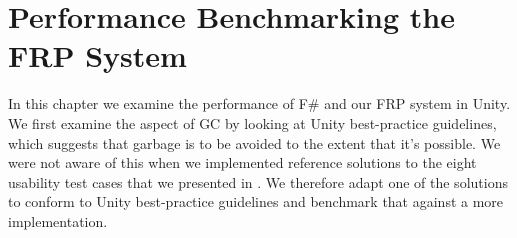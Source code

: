 \section{Performance Benchmarking the FRP System}
In this chapter we examine the performance of F\# and our \gls{FRP} system in Unity. We first examine the aspect of \gls{GC} by looking at Unity best-practice guidelines, which suggests that garbage is to be avoided to the extent that it's possible. We were not aware of this when we implemented reference solutions to the eight usability test cases that we presented in . We therefore adapt one of the solutions to conform to Unity best-practice guidelines and benchmark that against a more  implementation.


